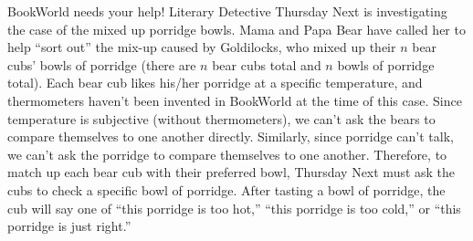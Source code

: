 \documentclass[10pt]{article}
\begin{document}
\noindent BookWorld needs your help! Literary Detective Thursday Next is investigating the case of the mixed up porridge bowls.  Mama and Papa Bear have called her to help ``sort out'' the mix-up caused by Goldilocks, who mixed up their $n$ bear cubs' bowls of porridge (there are $n$ bear cubs total and $n$ bowls of porridge total).  Each bear cub likes his/her porridge at a specific temperature, and thermometers haven't been invented in BookWorld at the time of this case.  Since temperature is subjective (without thermometers), we can't ask the bears to compare themselves to one another directly.  Similarly, since porridge can't talk, we can't ask the porridge to compare themselves to one another.  Therefore, to match up each bear cub with their preferred bowl, Thursday Next must ask the cubs to check a specific bowl of porridge.  After tasting a bowl of porridge, the cub will say one of ``this porridge is too hot,'' ``this porridge is too cold,'' or ``this porridge is just right.''
\end{document}
